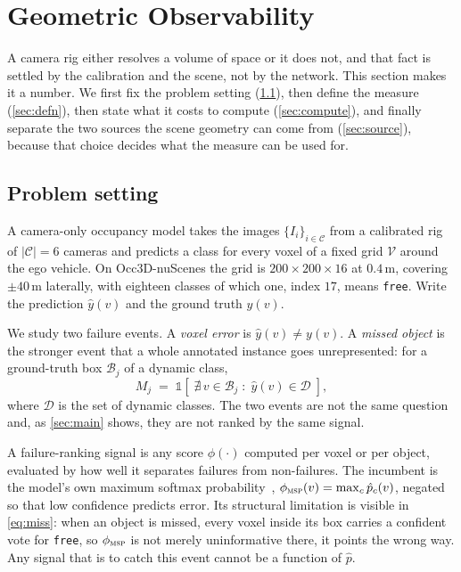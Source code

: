 \documentclass[10pt,twocolumn,letterpaper]{article}
\begin{document}
\section{Geometric Observability}

A camera rig either resolves a volume of space or it does not, and that
fact is settled by the calibration and the scene, not by the network. This
section makes it a number. We first fix the problem setting
(\cref{sec:prelim}), then define the measure (\cref{sec:defn}), then state
what it costs to compute (\cref{sec:compute}), and finally separate the two
sources the scene geometry can come from (\cref{sec:source}), because that
choice decides what the measure can be used for.

\subsection{Problem setting}
\label{sec:prelim}
A camera-only occupancy model takes the images $\{I_i\}_{i\in\mathcal{C}}$
from a calibrated rig of $|\mathcal{C}|=6$ cameras and predicts a class for
every voxel of a fixed grid $\mathcal{V}$ around the ego vehicle. On
Occ3D-nuScenes the grid is $200\times200\times16$ at $0.4$\,m, covering
$\pm40$\,m laterally, with eighteen classes of which one, index $17$,
means \texttt{free}. Write the prediction $\hat{y}(v)$ and the
ground truth $y(v)$.

We study two failure events. A \emph{voxel error} is
$\hat{y}(v)\neq y(v)$. A \emph{missed object} is the stronger event that a
whole annotated instance goes unrepresented: for a ground-truth box
$\mathcal{B}_j$ of a dynamic class,
\begin{equation}
M_j \;=\; \mathbb{1}\!\left[\;\nexists\, v \in \mathcal{B}_j
   \;:\; \hat{y}(v) \in \mathcal{D} \;\right],
\label{eq:miss}
\end{equation}
where $\mathcal{D}$ is the set of dynamic classes. The two events are not
the same question and, as \cref{sec:main} shows, they are not ranked by
the same signal.

A failure-ranking signal is any score $\phi(\cdot)$ computed per voxel or
per object, evaluated by how well it separates failures from non-failures.
The incumbent is the model's own maximum softmax
probability~\cite{hendrycks2017msp}, $\phi_{\textsc{msp}}(v) =
\max_c \hat{p}_c(v)$, negated so that low confidence predicts error. Its
structural limitation is visible in \cref{eq:miss}: when an object is
missed, every voxel inside its box carries a confident vote for
\texttt{free}, so $\phi_{\textsc{msp}}$ is not merely uninformative there,
it points the wrong way. Any signal that is to catch this event cannot be
a function of $\hat{p}$.
\end{document}
